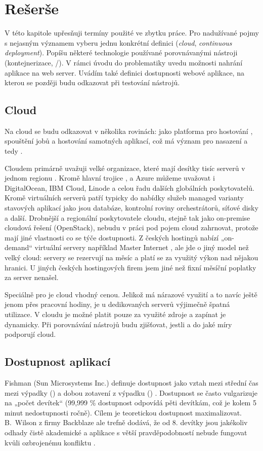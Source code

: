 \chapter{Rešerše}
    V této kapitole upřesňuji termíny použité ve zbytku práce. Pro nadužívané pojmy s nejasným významem vyberu jednu konkrétní definici (\textit{cloud}, \textit{continuous deployment}). Popíšu některé technologie používané porovnávanými \CI nástroji (kontejnerizace, /). V rámci úvodu do problematiky \CICD uvedu možnosti nahrání aplikace na web server. Uvádím také definici dostupnosti webové aplikace, na kterou se později budu odkazovat při testování \CICD nástrojů.

    \section*{Cloud}
        Na cloud se budu odkazovat v několika rovinách: jako platforma pro hostování \CI, spouštění jobů a hostování samotných aplikací, což má význam pro nasazení a tedy \CD.

        Cloudem primárně uvažuji velké organizace, které mají desítky tisíc serverů v jednom regionu \cite{pier-cloud}. Kromě hlavní trojice ,  a Azure můžeme uvažovat i DigitalOcean, IBM Cloud, Linode a celou řadu dalších globálních poskytovatelů. Kromě virtuálních serverů patří typicky do nabídky služeb managed varianty stavových aplikací jako jsou databáze, kontrolní roviny orchestrátorů, síťové disky a další. Drobnější a regionální poskytovatele cloudu, stejně tak jako on-premise cloudová řešení (OpenStack), nebudu v práci pod pojem cloud zahrnovat, protože mají jiné vlastnosti co se týče dostupnosti. Z českých hostingů nabízí „on-demand“ virtuální servery například Master Internet \cite{master-pricing}, ale jde o jiný model než velký cloud: servery se rezervují na měsíc a platí se za využitý výkon nad nějakou hranici. U jiných českých hostingových firem jsem jiné než fixní měsíční poplatky za server nenašel.

        Speciálně pro \CI je cloud vhodný cenou. Jelikož \CI má nárazové využití a to navíc ještě jenom přes pracovní hodiny, je u dedikovaných serverů výjimečně špatná utilizace. V cloudu je možné platit pouze za využité zdroje a zapínat je dynamicky. Při porovnávání \CI nástrojů budu zjišťovat, jestli a do jaké míry podporují cloud.

    \section*{Dostupnost aplikací}
        Fishman (Sun Microsystems Inc.) definuje dostupnost jako vztah mezi střední čas mezi výpadky () a dobou zotavení z výpadku () \cite{fishman-availability}. Dostupnost se často vulgarizuje na „počet devítek“ (99,999 \% dostupnost odpovídá pěti devítkám, což je kolem 5 minut nedostupnosti ročně). Cílem je teoretickou dostupnost maximalizovat. B.~Wilson z firmy Backblaze ale trefně dodává, že od 8. devítky jsou jakékoliv odhady čistě akademické a aplikace s větší pravděpodobností nebude fungovat kvůli ozbrojenému konfliktu \cite{backblaze-availability}.

